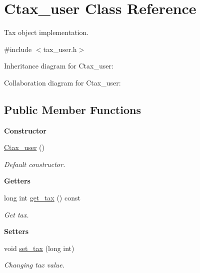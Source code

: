 \hypertarget{class_ctax__user}{}\section{Ctax\+\_\+user Class Reference}
\label{class_ctax__user}


Tax object implementation.  




{\ttfamily \#include $<$tax\+\_\+user.\+h$>$}



Inheritance diagram for Ctax\+\_\+user\+:


Collaboration diagram for Ctax\+\_\+user\+:
\subsection*{Public Member Functions}
\begin{Indent}{\bf Constructor}\par
\begin{DoxyCompactItemize}
\item 
\hyperlink{class_ctax__user_ae6899d23d2994b08747ab5797bd4c8ac}{Ctax\+\_\+user} ()
\begin{DoxyCompactList}\small\item\em Default constructor. \end{DoxyCompactList}\end{DoxyCompactItemize}
\end{Indent}
\begin{Indent}{\bf Getters}\par
\begin{DoxyCompactItemize}
\item 
long int \hyperlink{class_ctax__user_a824f6643ab14fb2ae4233641a08aff68}{get\+\_\+tax} () const 
\begin{DoxyCompactList}\small\item\em Get tax. \end{DoxyCompactList}\end{DoxyCompactItemize}
\end{Indent}
\begin{Indent}{\bf Setters}\par
\begin{DoxyCompactItemize}
\item 
void \hyperlink{class_ctax__user_abc465fdfa520b34c223016c1a926ddb1}{set\+\_\+tax} (long int)
\begin{DoxyCompactList}\small\item\em Changing tax value. \end{DoxyCompactList}\end{DoxyCompactItemize}
\end{Indent}


